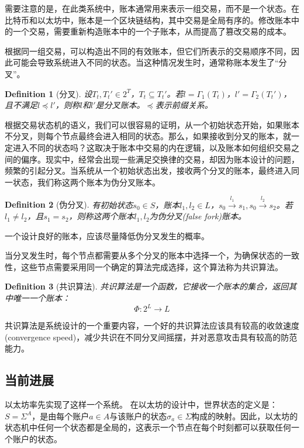 \documentclass[UTF8,nofonts]{ctexart}
\newtheorem{definition}{Definition}[section]
\begin{document}
\begin{multicols}{2}
需要注意的是，在此类系统中，账本通常用来表示一组交易，而不是一个状态。在比特币\cite{nakamoto2008bitcoin}和以太坊\cite{wood2014ethereum}中，账本是一个区块链结构，其中交易是全局有序的。修改账本中的一个交易，需要重新构造账本中的一个子账本，从而提高了篡改交易的成本。

根据同一组交易，可以构造出不同的有效账本，但它们所表示的交易顺序不同，因此可能会导致系统进入不同的状态。当这种情况发生时，通常称账本发生了“分叉”。
\begin{definition}[分叉] \label{def:fork}
设$T_{t},{T_{t}}' \in 2^{T}$，$T_{t} \subseteq {T_{t}}'$。若$l=\Gamma_{1}(T_{t})$，${l}'= \Gamma_{2}({T_{t}}')$，且不满足$l \preceq {l}'$，则称$l$和${l}'$是分叉账本。$\preceq$表示前缀关系。
\end{definition}

根据交易状态机的语义，我们可以很容易的证明，从一个初始状态开始，如果账本不分叉，则每个节点最终会进入相同的状态。那么，如果接收到分叉的账本，就一定进入不同的状态吗？这取决于账本中交易的内在逻辑，以及账本如何组织交易之间的偏序。现实中，经常会出现一些满足交换律的交易，却因为账本设计的问题，频繁的引起分叉。当系统从一个初始状态出发，接收两个分叉的账本，最终进入同一状态，我们称这两个账本为伪分叉账本。

\begin{definition}[伪分叉] \label{def:falsefork}
有初始状态$s_{0} \in S$，账本$l_{1},l_{2} \in L$，$s_{0}\overset{l_{1}}{\rightarrow}s_{1}, s_{0}\overset{l_{2}}{\rightarrow}s_{2}$。若$l_{1} \neq l_{2}$，且$s_{1}=s_{2}$，则称这两个账本$l_{1} ,l_{2}$为伪分叉(false fork)账本。
\end{definition}

一个设计良好的账本，应该尽量降低伪分叉发生的概率。

当分叉发生时，每个节点都需要从多个分叉的账本中选择一个，为确保状态的一致性，这些节点需要采用同一个确定的算法完成选择，这个算法称为共识算法。

\begin{definition}[共识算法] \label{def:consensus}
共识算法是一个函数，它接收一个账本的集合，返回其中唯一一个账本：
$$\Phi: 2^{L} \rightarrow L$$
\end{definition}

共识算法是系统设计的一个重要内容，一个好的共识算法应该具有较高的收敛速度(convergence speed)，减少共识在不同分叉间摇摆，并对恶意攻击具有较高的防范能力。

\subsection{当前进展}
以太坊\cite{buterin2017ethereum}率先实现了这样一个系统。
在以太坊的设计中，世界状态的定义是：$S = \Sigma^{A}$，是由每个账户$a \in A$与该账户的状态$\sigma_{a} \in \Sigma$构成的映射。因此，以太坊的状态机中任何一个状态都是全局的，这表示一个节点在每个时刻都可以获取任何一个账户的状态。


\end{multicols}
\end{document}
